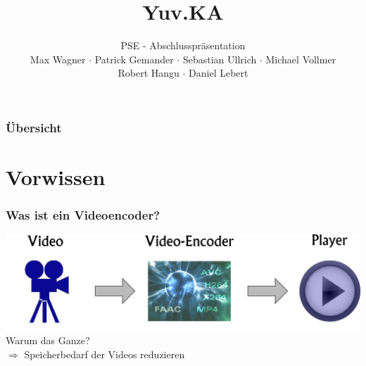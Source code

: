 \documentclass[t]{beamer}
\title{Yuv.KA}
\subtitle{PSE - Abschlusspräsentation \\[0.3cm]
Max Wagner $\cdot$ Patrick Gemander $\cdot$ Sebastian Ullrich $\cdot$ Michael Vollmer \\ Robert Hangu $\cdot$ Daniel Lebert}
\institute[ITEC]{Institut für Technische Informatik}
\begin{document}
\begin{frame}
	\maketitle
\end{frame}

\begin{frame}
	\frametitle{Übersicht}
	\tableofcontents
\end{frame}

\section{Vorwissen}
\begin{frame}
	\frametitle{Was ist ein Videoencoder?}
	\begin{center}
		\vspace*{\fill}
		\includegraphics[scale=.43]{video-encoding-process.png}
		\vspace*{\fill}
		\onslide<2-> Warum das Ganze? ~\\
		\onslide<3-> $ \Longrightarrow $ Speicherbedarf der Videos reduzieren
	\end{center}
\end{frame}
\end{document}
